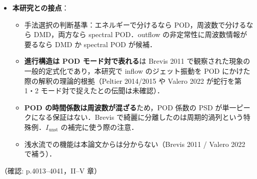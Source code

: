 \documentclass[11pt]{jsarticle}
\begin{document}
\begin{itemize}
  \item \textbf{本研究との接点}：
  \begin{itemize}
    \item 手法選択の判断基準：エネルギーで分けるなら POD，周波数で分けるなら DMD，両方なら spectral POD．outflow の非定常性に周波数情報が要るなら DMD か spectral POD が候補．
    \item \textbf{進行構造は POD モード対で表れる}は Brevis 2011 で観察された現象の一般的定式化であり，本研究で inflow のジェット振動を POD にかけた際の解釈の理論的根拠（Peltier 2014/2015 や Valero 2022 が蛇行を第 1・2 モード対で捉えたとの伝聞は未確認）．
    \item \textbf{POD の時間係数は周波数が混ざる}ため，POD 係数の PSD が単一ピークになる保証はない．Brevis で綺麗に分離したのは周期的渦列という特殊例．$I_\mathrm{unst}$ の補完に使う際の注意．
    \item 浅水流での機能は本論文からは分からない（Brevis 2011 / Valero 2022 で補う）．
  \end{itemize}
\end{itemize}
\noindent（確認: p.4013--4041，II--V 章）
\end{document}
